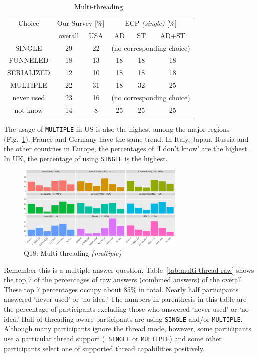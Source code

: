 \documentclass[conference,10pt,letterpaper]{IEEEtran}
\def\myquote#1{`#1'}
\begin{document}
\begin{table}[htb]%
\begin{center}%
\caption{Multi-threading}\label{tab:multi-thread}%
\begin{tabular}{c||c|c||c|c|c}%
\hline%
Choice & \multicolumn{2}{c||}{Our Survey [\%]} & 
\multicolumn{3}{c}{ECP {\it(single)} [\%]} \\
\cline{2-6}%
 & overall & USA & AD & ST & AD+ST \\
\hline%
SINGLE & 29 & 22 & \multicolumn{3}{c}{\tiny (no corresponding choice)} \\
FUNNELED & 18 & 13 & 18 & 18 & 18 \\
SERIALIZED & 12 & 10 & 18 & 18 & 18 \\
MULTIPLE & 22 & 31 & 18 & 32 & 25 \\
never used & 23 & 16 & \multicolumn{3}{c}{\tiny (no corresponding choice)} \\
not know & 14 & 8 & 25 & 25 & 25\\
\hline%
\end{tabular}%
\end{center}%
\end{table}%

The usage of {\tt MULTIPLE} in US is also the highest among the major
regions (Fig.~\ref{fig:multi-thread}). France and Germany have the
same trend. In Italy, Japan, Russia and the
other countries in Europe, the percentages of \myquote{I don't know}
are the highest. In UK, the percentage of using {\tt SINGLE} is the
highest.

\begin{figure}[htb]
\begin{center}
\includegraphics[width=8cm]{R-scripts/Q18.pdf}
\caption{Q18: Multi-threading {\it(multiple)}}
\label{fig:multi-thread}
\end{center}
\end{figure}

Remember this is a multiple answer
question. Table~\ref{tab:multi-thread-raw} shows the top 7 of the 
percentages of raw answers (combined answers) of the
overall. These top 7 percentages occupy about 85\% in
total. Nearly half 
participants answered \myquote{never used} or \myquote{no idea.} The
numbers in parenthesis in this table are the percentage of 
participants excluding those who answered \myquote{never used} or
\myquote{no idea.} Half of threading-aware participants are using
        {\tt SINGLE}  
and/or {\tt MULTIPLE}. Although many participants ignore the thread
mode, however, some participants use a particular thread support ({\tt
  SINGLE} or {\tt MULTIPLE}) and some other participants select one of
supported thread capabilities positively. 
\end{document}
